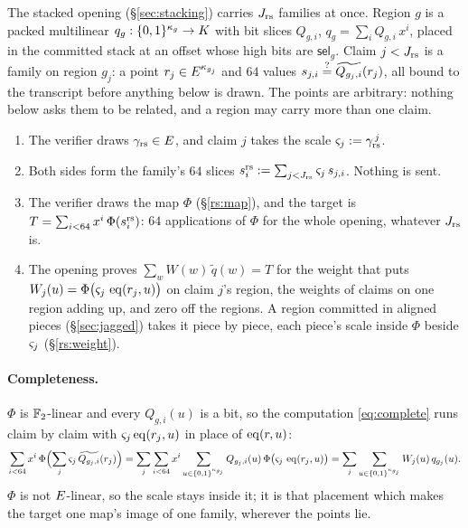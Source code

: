 The stacked opening (\S\ref{sec:stacking}) carries $J_{\mathrm{rs}}$ families at once. Region $g$ is a packed multilinear $q_g:\{0,1\}^{\kappa_g}\to K$ with bit slices $Q_{g,i}$, $q_g=\sum_iQ_{g,i}\,x^i$, placed in the committed stack at an offset whose high bits are $\mathsf{sel}_g$. Claim $j<J_{\mathrm{rs}}$ is a family on region $g_j$: a point $r_j\in E^{\kappa_{g_j}}$ and $64$ values $s_{j,i}\stackrel{?}{=}\widetilde{Q_{g_j,i}}(r_j)$, all bound to the transcript before anything below is drawn. The points are arbitrary: nothing below asks them to be related, and a region may carry more than one claim.

\begin{enumerate}
\item The verifier draws $\gamma_{\mathrm{rs}}\in E$, and claim $j$ takes the scale $\varsigma_j:=\gamma_{\mathrm{rs}}^{\,j}$.
\item Both sides form the family's $64$ slices $s^{\mathrm{rs}}_{i}:=\sum_{j<J_{\mathrm{rs}}}\varsigma_j\,s_{j,i}$. Nothing is sent.
\item The verifier draws the map $\Phi$ (\S\ref{rs:map}), and the target is $T=\sum_{i<64}x^i\,\Phi(s^{\mathrm{rs}}_{i})$: $64$ applications of $\Phi$ for the whole opening, whatever $J_{\mathrm{rs}}$ is.
\item The opening proves $\sum_wW(w)\,\widetilde q(w)=T$ for the weight that puts $W_j(u)=\Phi\bigl(\varsigma_j\,\operatorname{eq}(r_j,u)\bigr)$ on claim $j$'s region, the weights of claims on one region adding up, and zero off the regions. A region committed in aligned pieces (\S\ref{sec:jagged}) takes it piece by piece, each piece's scale inside $\Phi$ beside $\varsigma_j$ (\S\ref{rs:weight}).
\end{enumerate}

\paragraph{Completeness.} $\Phi$ is $\mathbb{F}_2$-linear and every $Q_{g,i}(u)$ is a bit, so the computation \eqref{eq:complete} runs claim by claim with $\varsigma_j\operatorname{eq}(r_j,u)$ in place of $\operatorname{eq}(r,u)$:
\[
\sum_{i<64}x^i\,\Phi\Bigl(\sum_j\varsigma_j\,\widetilde{Q_{g_j,i}}(r_j)\Bigr)
=\sum_j\sum_{i<64}x^i\sum_{u\in\{0,1\}^{\kappa_{g_j}}}Q_{g_j,i}(u)\,\Phi\bigl(\varsigma_j\,\operatorname{eq}(r_j,u)\bigr)
=\sum_j\sum_{u\in\{0,1\}^{\kappa_{g_j}}}W_j(u)\,q_{g_j}(u).
\]
$\Phi$ is not $E$-linear, so the scale stays inside it; it is that placement which makes the target one map's image of one family, wherever the points lie.

